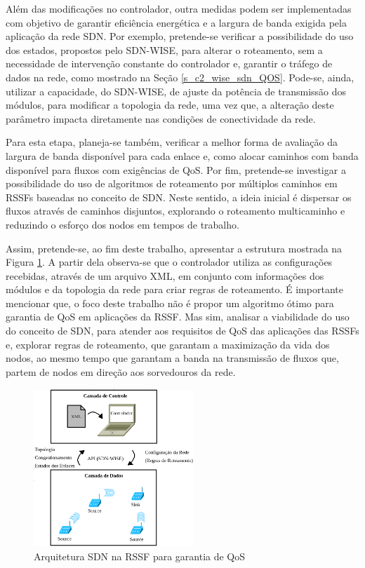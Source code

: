 Além das modificações no controlador, outra medidas podem ser implementadas com objetivo de garantir eficiência energética e a largura de banda exigida pela aplicação da rede \ac{SDN}. Por exemplo, pretende-se verificar a possibilidade do uso dos estados, propostos pelo \ac{SDN-WISE}, para alterar o roteamento, sem a necessidade de intervenção constante do controlador e, garantir o tráfego de dados na rede, como mostrado na Seção \ref{s_c2_wise_sdn_QOS}. Pode-se, ainda, utilizar a capacidade, do \ac{SDN-WISE}, de ajuste da potência de transmissão dos módulos, para modificar a topologia da rede, uma vez que, a alteração deste parâmetro impacta diretamente nas condições de conectividade da rede.

Para esta etapa, planeja-se também, verificar a melhor forma de avaliação da largura de banda disponível para cada enlace e, como alocar caminhos com banda disponível para fluxos com exigências de \ac{QoS}. Por fim, pretende-se investigar a possibilidade do uso de algoritmos de roteamento por múltiplos caminhos em \ac{RSSF}s baseadas no conceito de \ac{SDN}. Neste sentido, a ideia inicial é dispersar os fluxos através de caminhos disjuntos, explorando o roteamento multicaminho e reduzindo o esforço dos nodos em tempos de trabalho. 

Assim, pretende-se, ao fim deste trabalho, apresentar a estrutura mostrada na Figura \ref{Arch_wiseSDN_TCC}. A partir dela observa-se que o controlador utiliza as configurações recebidas, através de um arquivo \ac{XML}, em conjunto com informações dos módulos e da topologia da rede para criar regras de roteamento. É importante mencionar que, o foco deste trabalho não é propor um algoritmo ótimo para garantia de \ac{QoS} em aplicações da \ac{RSSF}. Mas sim, analisar a viabilidade do uso do conceito de \ac{SDN}, para atender aos requisitos de \ac{QoS} das aplicações das \ac{RSSF}s e, explorar regras de roteamento, que garantam a maximização da vida dos nodos, ao mesmo tempo que garantam a banda na transmissão de fluxos que, partem de nodos em direção aos sorvedouros da rede.


\begin{figure}[!htb]
    \centering
    \includegraphics[width=6cm]{figs/Arch_wiseSDN_TCC.png}
    \caption{Arquitetura \ac{SDN} na \ac{RSSF} para garantia de \ac{QoS}}
    \label{Arch_wiseSDN_TCC}
\end{figure}


